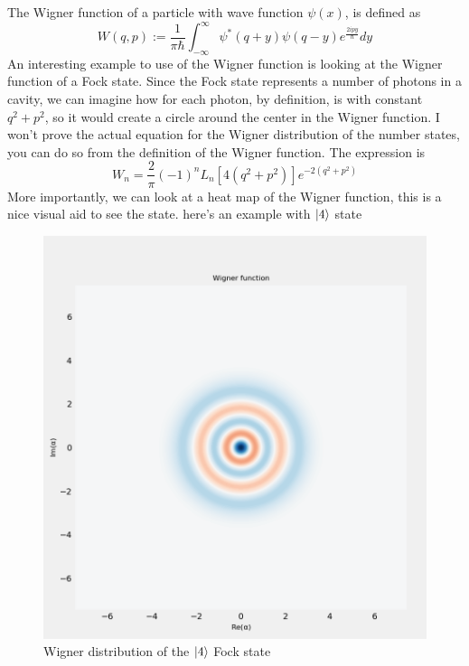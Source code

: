 \documentclass[english, a4paper, 12pt, twoside]{article}
\numberwithin{equation}{section} %
\begin{document}
The Wigner function of a particle with wave function $\psi(x)$, is defined as 
\[
    W(q, p) := \frac{1}{\pi \hbar} \int_{-\infty}^\infty \psi^*(q + y) \psi(q - y) e^{\frac{2ipy}{\hbar}} dy
\]
An interesting example to use of the Wigner function is looking at the Wigner function of a Fock state. Since the Fock state represents a number of photons in a cavity, we can imagine how for each photon, by definition, is with constant $q^2 + p^2$, so it would create a circle around the center in the Wigner function. I won't prove the actual equation for the Wigner distribution of the number states, you can do so from the definition of the Wigner function. The expression is
\[
    W_n = \frac{2}{\pi}(-1)^n L_n[4(q^2 + p^2)]e^{-2(q^2 + p^2)}
\]
More importantly, we can look at a heat map of the Wigner function, this is a nice visual aid to see the state. here's an example with $\ket{4}$ state
\begin{figure}[H]
    \centering
    \includegraphics[width=0.4\columnwidth]{Wigner.png}
    \caption{Wigner distribution of the $\ket{4}$ Fock state}
    \label{fig:Fock-State-Wigner}
\end{figure}





\end{document}
